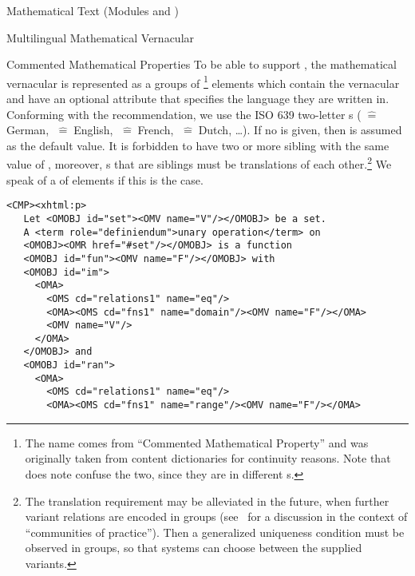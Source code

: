 \begin{tchapter}[id=mtxt,short=Mathematical Text]{Mathematical Text (Modules
  {} and {})}
\begin{tsection}[id=mtext]{Multilingual Mathematical Vernacular}
\begin{tsubsection}{Commented Mathematical Properties}
  To be able to support
  {},
  the mathematical vernacular is represented as a groups of {}\footnote{The
    name comes from ``Commented Mathematical Property'' and was originally taken from
    {\openmath} content dictionaries for continuity
    reasons. Note that {\xml} does note confuse the two, since they are in different
    {s}.}  elements which contain the vernacular and have an optional
  {} attribute that specifies the language they are
  written in. Conforming with the {\xml} recommendation, we use the ISO
  639 two-letter {s}
  ({}$\;\widehat=\;$German, {}$\;\widehat=\;$English,
  {}$\;\widehat=\;$French, {}$\;\widehat=\;$Dutch, \ldots). If
  no {} is given, then {} is
  assumed as the default value. It is forbidden to have two or more sibling
  {} with the same value of {}, moreover,
  {}s that are siblings must be translations of each other.\footnote{The
    translation requirement may be alleviated in the future, when further variant
    relations are encoded in {} groups (see~\cite{KohKoh:copmem06} for a
    discussion in the context of ``communities of practice''). Then a generalized
    uniqueness condition must be observed in {} groups, so that systems can
    choose between the supplied variants.} We speak of a {}
  of {} elements if this is the case.
\begin{lstlisting}[escapechar=\%,label=lst:multiling,mathescape,
  caption={A Multilingual Group of {\element{CMP}} Elements},
  index={trl,xml:lang,CMP,FMP,OMOBJ}]
 <CMP><xhtml:p>
   Let <OMOBJ id="set"><OMV name="V"/></OMOBJ> be a set. 
   A <term role="definiendum">unary operation</term> on 
   <OMOBJ><OMR href="#set"/></OMOBJ> is a function  
   <OMOBJ id="fun"><OMV name="F"/></OMOBJ> with
   <OMOBJ id="im">
     <OMA>
       <OMS cd="relations1" name="eq"/>
       <OMA><OMS cd="fns1" name="domain"/><OMV name="F"/></OMA>
       <OMV name="V"/>
     </OMA>
   </OMOBJ> and 
   <OMOBJ id="ran">
     <OMA>
       <OMS cd="relations1" name="eq"/>
       <OMA><OMS cd="fns1" name="range"/><OMV name="F"/></OMA>

\end{lstlisting}
\end{tsubsection}
\end{tsection}
\end{tchapter}
